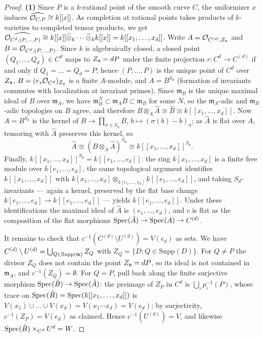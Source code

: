 \begin{proof}
    \textbf{(1)} Since $P$ is a $k$-rational point of the smooth curve $C$, the uniformizer $x$ induces
    $\widehat{\mathcal{O}_{C,P}} \cong k[[x]]$. As completion at rational points takes products of $k$-varieties to completed tensor
    products, we get $\widehat{\mathcal{O}_{C^d, (P, \dots, P)}} \cong k[[x]] \widehat{\otimes}_k \cdots \widehat{\otimes}_k k[[x]] = k[[x_1, \dots, x_d]]$.
    Write $A = \mathcal{O}_{C^{(d)}, Z_{\mathfrak{n}}}$ and $B = \mathcal{O}_{C^d, (P, \dots, P)}$.
    Since $k$ is algebraically closed, a closed point $(Q_1, \dots, Q_d) \in C^d$ maps to $Z_{\mathfrak{n}} = dP$ under the finite
    projection $r: C^d \to C^{(d)}$ if and only if $Q_1 = \dots = Q_d = P$; hence $(P, \dots, P)$ is the unique point of
    $C^d$ over $Z_{\mathfrak{n}}$, $B = (r_* \mathcal{O}_{C^d})_{Z_{\mathfrak{n}}}$ is a finite $A$-module, and $A = B^{S_d}$ (formation of invariants
    commutes with localization at invariant primes).
    Since $\mathfrak{m}_B$ is the unique maximal ideal of $B$ over $\mathfrak{m}_A$, we have
    $\mathfrak{m}_B^N \subset \mathfrak{m}_A B \subset \mathfrak{m}_B$ for some $N$, so the $\mathfrak{m}_A$-adic and
    $\mathfrak{m}_B$-adic topologies on $B$ agree, and therefore $B \otimes_A \hat{A} \cong \hat{B} \cong k[[x_1, \dots, x_d]]$.
    Now $A = B^{S_d}$ is the kernel of $B \to \prod_{\sigma \in S_d} B$, $b \mapsto (\sigma(b) - b)_\sigma$; as $\hat{A}$ is
    flat over $A$, tensoring with $\hat{A}$ preserves this kernel, so
    $$\hat{A} \cong (B \otimes_A \hat{A})^{S_d} \cong k[[x_1, \dots, x_d]]^{S_d}.$$
    Finally, $k[[x_1, \dots, x_d]]^{S_d} = k[[e_1, \dots, e_d]]$: the ring $k[x_1, \dots, x_d]$ is a finite free module over
    $k[e_1, \dots, e_d]$, the same topological argument identifies $k[[x_1, \dots, x_d]]$ with
    $k[x_1, \dots, x_d] \otimes_{k[e_1, \dots, e_d]} k[[e_1, \dots, e_d]]$, and taking $S_d$-invariants --- again a kernel,
    preserved by the flat base change $k[e_1, \dots, e_d] \to k[[e_1, \dots, e_d]]$ --- yields $k[[e_1, \dots, e_d]]$.
    Under these identifications the maximal ideal of $\hat{A}$ is $(e_1, \dots, e_d)$, and $c$ is flat as the composition of
    the flat morphisms $\operatorname{Spec}(\hat{A}) \to \operatorname{Spec}(A) \to C^{(d)}$.

    It remains to check that $c^{-1}(C^{(d)} \setminus U^{(d)}) = V(e_d)$ as sets. We have
    $C^{(d)} \setminus U^{(d)} = \bigcup_{Q \in \mathrm{Supp}(\mathfrak{m})} Z_Q$ with $Z_Q = \{D : Q \in \mathrm{Supp}(D)\}$. For
    $Q \neq P$ the divisor $Z_Q$ does not contain the point
    $Z_{\mathfrak{n}} = dP$, so its ideal is not contained in $\mathfrak{m}_A$, and $c^{-1}(Z_Q) = \emptyset$. For $Q = P$, pull back
    along the finite surjective morphism $\operatorname{Spec}(\hat{B}) \to \operatorname{Spec}(\hat{A})$: the preimage of $Z_P$ in $C^d$ is
    $\bigcup_i p_i^{-1}(P)$, whose trace on $\operatorname{Spec}(\hat{B}) = \operatorname{Spec}(k[[x_1, \dots, x_d]])$ is
    $V(x_1) \cup \dots \cup V(x_d) = V(x_1 \cdots x_d) = V(e_d)$; by surjectivity, $c^{-1}(Z_P) = V(e_d)$ as claimed. Hence
    $c^{-1}(U^{(d)}) = V$, and likewise $\operatorname{Spec}(\hat{B}) \times_{C^d} U^d = W$.


\end{proof}
